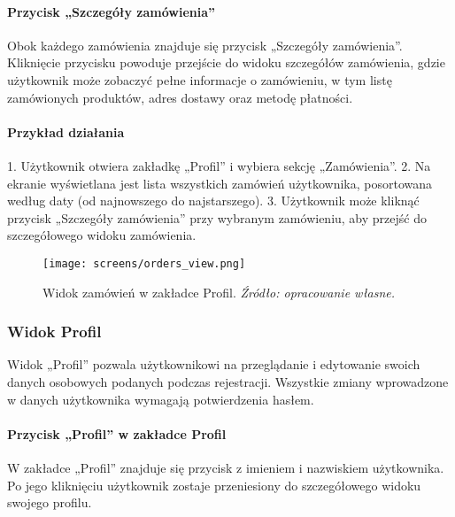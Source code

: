 \documentclass[12pt,a4paper,oneside]{article}
\theoremstyle{definition}
\numberwithin{equation}{section}
\begin{document}
\paragraph{Przycisk „Szczegóły zamówienia”}
Obok każdego zamówienia znajduje się przycisk „Szczegóły zamówienia”. Kliknięcie przycisku powoduje przejście do widoku szczegółów zamówienia, gdzie użytkownik może zobaczyć pełne informacje o zamówieniu, w tym listę zamówionych produktów, adres dostawy oraz metodę płatności.

\paragraph{Przykład działania}
1. Użytkownik otwiera zakładkę „Profil” i wybiera sekcję „Zamówienia”.
2. Na ekranie wyświetlana jest lista wszystkich zamówień użytkownika, posortowana według daty (od najnowszego do najstarszego).
3. Użytkownik może kliknąć przycisk „Szczegóły zamówienia” przy wybranym zamówieniu, aby przejść do szczegółowego widoku zamówienia.

\begin{figure}[H]
    \centering
    \texttt{[image: screens/orders\_view.png]}
    \caption{Widok zamówień w zakładce Profil. \emph{Źródło: opracowanie własne.}}
    \label{fig:orders_view}
\end{figure}




\subsubsection{Widok Profil}
Widok „Profil” pozwala użytkownikowi na przeglądanie i edytowanie swoich danych osobowych podanych podczas rejestracji. Wszystkie zmiany wprowadzone w danych użytkownika wymagają potwierdzenia hasłem.

\paragraph{Przycisk „Profil” w zakładce Profil}
W zakładce „Profil” znajduje się przycisk z imieniem i nazwiskiem użytkownika. Po jego kliknięciu użytkownik zostaje przeniesiony do szczegółowego widoku swojego profilu.
\end{document}
